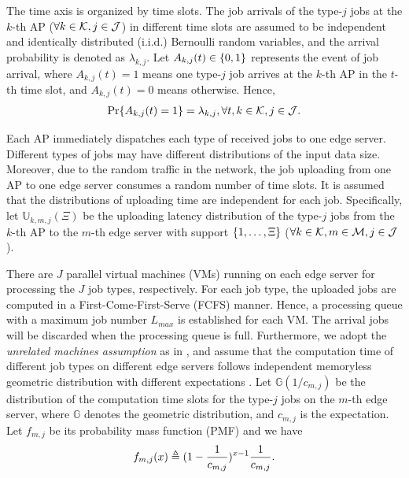 The time axis is organized by time slots.
The job arrivals of the type-$j$ jobs at the $k$-th AP ($\forall k\in\mathcal{K},j\in\mathcal{J}$) in different time slots are assumed to be independent and identically distributed (i.i.d.) Bernoulli random variables, and the arrival probability is denoted as $\lambda_{k,j}$.
Let $A_{k,j}(t) \in \{0,1\}$ represents the event of job arrival, where $A_{k,j}(t)=1$ means one type-$j$ job arrives at the $k$-th AP in the $t$-th time slot, and $A_{k,j}(t)=0$ means otherwise.
Hence,
\begin{align}
    \Pr\{ A_{k,j}(t) = 1 \} = \lambda_{k,j}, \forall t,k\in\mathcal{K},j\in\mathcal{J}.
\end{align}

Each AP immediately dispatches each type of received jobs to one edge server.
Different types of jobs may have different distributions of the input data size.
Moreover, due to the random traffic in the network, the job uploading from one AP to one edge server consumes a random number of time slots.
It is assumed that the distributions of uploading time are independent for each job.
Specifically, let $\mathbb{U}_{k,m,j}(\Xi)$ be the uploading latency distribution of the type-$j$ jobs from the $k$-th AP to the $m$-th edge server with support $\{1, \dots, \Xi\}$ ($\forall k\in\mathcal{K}, m\in\mathcal{M}, j\in\mathcal{J}$).

There are $J$ parallel virtual machines (VMs) running on each edge server for processing the $J$ job types, respectively.
For each job type, the uploaded jobs are computed in a First-Come-First-Serve (FCFS) manner.
Hence, a processing queue with a maximum job number $L_{max}$ is established for each VM.
The arrival jobs will be discarded when the processing queue is full.
Furthermore, we adopt the \emph{unrelated machines assumption} as in \cite{tan-online}, and assume that the computation time of different job types on different edge servers follows independent memoryless geometric distribution with different expectations \cite{TOWC18-HuangKb}.
Let $\mathbb{G}(1/c_{m,j})$ be the distribution of the computation time slots for the type-$j$ jobs on the $m$-th edge server, where $\mathbb{G}$ denotes the geometric distribution, and $c_{m,j}$ is the expectation.
Let $f_{m,j}$ be its probability mass function (PMF) and we have
\begin{align}
    f_{m,j}(x) \triangleq (1-\frac{1}{c_{m,j}})^{x-1} \frac{1}{c_{m,j}}.
\end{align}

